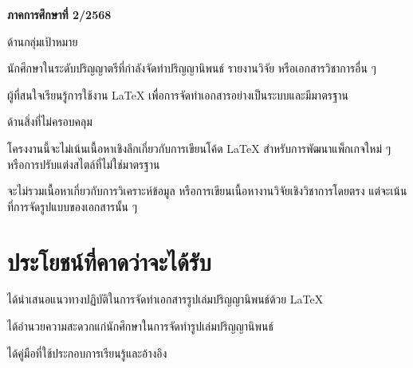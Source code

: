\hspace*{1 cm}\textbf{ภาคการศึกษาที่ 2/2568}
\begin{mycustomenum2}
    \item ด้านกลุ่มเป้าหมาย
    \begin{mycustomenum2}
        \item นักศึกษาในระดับปริญญาตรีที่กำลังจัดทำปริญญานิพนธ์ รายงานวิจัย หรือเอกสารวิชาการอื่น ๆ
        \item ผู้ที่สนใจเรียนรู้การใช้งาน LaTeX เพื่อการจัดทำเอกสารอย่างเป็นระบบและมีมาตรฐาน
    \end{mycustomenum2}

    \item ด้านสิ่งที่ไม่ครอบคลุม
    \begin{mycustomenum2}
        \item โครงงานนี้จะไม่เน้นเนื้อหาเชิงลึกเกี่ยวกับการเขียนโค้ด LaTeX สำหรับการพัฒนาแพ็กเกจใหม่ ๆ หรือการปรับแต่งสไตล์ที่ไม่ใช่มาตรฐาน
        \item จะไม่รวมเนื้อหาเกี่ยวกับการวิเคราะห์ข้อมูล หรือการเขียนเนื้อหางานวิจัยเชิงวิชาการโดยตรง แต่จะเน้นที่การจัดรูปแบบของเอกสารนั้น ๆ
    \end{mycustomenum2}
\end{mycustomenum2}



\section{ประโยชน์ที่คาดว่าจะได้รับ}

\begin{mycustomenum}[label=1.4.\arabic*] %
    \item ได้นำเสนอแนวทางปฏิบัติในการจัดทำเอกสารรูปเล่มปริญญานิพนธ์ด้วย LaTeX
    \item ได้อำนวยความสะดวกแก่นักศึกษาในการจัดทำรูปเล่มปริญญานิพนธ์
    \item ได้คู่มือที่ใช้ประกอบการเรียนรู้และอ้างอิง
\end{mycustomenum}
